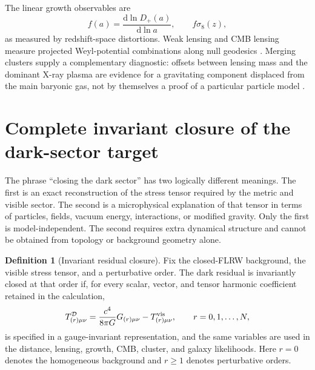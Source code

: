 \documentclass[
  aps,
  prd,
  reprint,
  superscriptaddress,
  nofootinbib,
  floatfix,
  longbibliography
]{revtex4-2}
\theoremstyle{plain}
\theoremstyle{definition}
\newtheorem{definition}[theorem]{Definition}
\theoremstyle{remark}
\newcommand{\dd}{\mathrm d}
\newcommand{\D}{\mathcal D}
\begin{document}
The linear growth observables are
\begin{equation}
f(a)=\frac{\dd\ln D_+(a)}{\dd\ln a},\qquad f\sigma_8(z),
\label{eq:growth}
\end{equation}
as measured by redshift-space distortions.  Weak lensing and CMB lensing
measure projected Weyl-potential combinations along null geodesics
\cite{ACTDR62024,DESY32022}.  Merging clusters supply a complementary
diagnostic: offsets between lensing mass and the dominant X-ray plasma are
evidence for a gravitating component displaced from the main baryonic gas, not
by themselves a proof of a particular particle model \cite{BulletCluster2006}.


\section{Complete invariant closure of the dark-sector target}
\label{sec:complete_invariant_closure}

The phrase ``closing the dark sector'' has two logically different meanings.
The first is an exact reconstruction of the stress tensor required by the metric
and visible sector.  The second is a microphysical explanation of that tensor in
terms of particles, fields, vacuum energy, interactions, or modified gravity.
Only the first is model-independent.  The second requires extra dynamical
structure and cannot be obtained from topology or background geometry alone.

\begin{definition}[Invariant residual closure]
Fix the closed-FLRW background, the visible stress tensor, and a perturbative
order.  The dark residual is invariantly closed at that order if, for every
scalar, vector, and tensor harmonic coefficient retained in the calculation,
\begin{equation}
T^{\D}_{(r)\mu\nu}
=\frac{c^4}{8\pi G}G_{(r)\mu\nu}-T^{{\rm vis}}_{(r)\mu\nu},
\qquad r=0,1,\ldots,N ,
\label{eq:order_by_order_residual}
\end{equation}
is specified in a gauge-invariant representation, and the same variables are
used in the distance, lensing, growth, CMB, cluster, and galaxy likelihoods.
Here $r=0$ denotes the homogeneous background and $r\geq1$ denotes perturbative
orders.
\end{definition}
\end{document}
